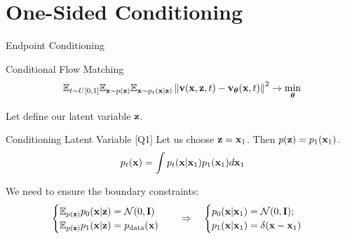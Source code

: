 \documentclass{beamer}
\renewcommand{\eqpause}{}
\renewcommand{\nextonslide}[1]{#1}
\begin{document}
\section{One-Sided Conditioning}
\begin{frame}{Endpoint Conditioning}
	\begin{block}{Conditional Flow Matching}
		\vspace{-0.5cm}
		\[
			\mathbb{E}_{t \sim U[0, 1]} \mathbb{E}_{\mathbf{z} \sim p(\mathbf{z})} \mathbb{E}_{\mathbf{x} \sim p_t(\mathbf{x} | \mathbf{z})}\left\| \mathbf{v}(\mathbf{x}, \mathbf{z}, t) - \mathbf{v}_{\boldsymbol{\theta}}(\mathbf{x}, t) \right\|^2 \rightarrow \min_{\boldsymbol{\theta}}
		\]
		\vspace{-0.5cm}
	\end{block}
	Let define our latent variable $\mathbf{z}$.
	\eqpause
	\begin{block}{Conditioning Latent Variable [Q1]}
		Let us choose $\mathbf{z} = \mathbf{x}_1$. Then $p(\mathbf{z}) = p_1(\mathbf{x}_1)$.
		\[
			p_t(\mathbf{x}) = \int p_t(\mathbf{x} | \mathbf{x}_1) p_1(\mathbf{x}_1) d \mathbf{x}_1
		\]
	\end{block}
	\vspace{-0.3cm}
	\eqpause
	We need to ensure the boundary constraints:
	\[
		\begin{cases}
			\bbE_{p(\bz)} p_0(\bx | \bz) = \cN(0, \bI) \\
			\bbE_{p(\bz)} p_1(\bx | \bz) = \pd(\bx)
		\end{cases}
		\quad 
		\nextonslide{
			\Rightarrow \quad 
			\begin{cases}
				p_0(\bx | \bx_1) = \cN(0, \bI); \\
				p_1(\bx | \bx_1) = \delta(\bx - \bx_1)
			\end{cases}
		}
	\]
	\vspace{-0.3cm}
\end{frame}
\end{document}
